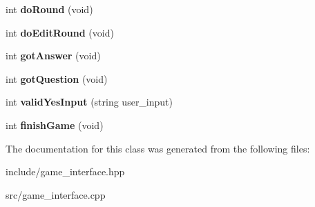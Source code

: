 \begin{DoxyCompactItemize}
\item 
int {\bfseries do\+Round} (void)\hypertarget{classGameInterface_a34f3d7f2ba56662cc0108b54b19fc162}{}\label{classGameInterface_a34f3d7f2ba56662cc0108b54b19fc162}

\item 
int {\bfseries do\+Edit\+Round} (void)\hypertarget{classGameInterface_ad254aa8d489bc420592eae3ed3bc008d}{}\label{classGameInterface_ad254aa8d489bc420592eae3ed3bc008d}

\item 
int {\bfseries got\+Answer} (void)\hypertarget{classGameInterface_a0a7e8e6ca668c755e8ccc94ff091dd5b}{}\label{classGameInterface_a0a7e8e6ca668c755e8ccc94ff091dd5b}

\item 
int {\bfseries got\+Question} (void)\hypertarget{classGameInterface_afb911f0c555e8c3ba0f4be8974a49a58}{}\label{classGameInterface_afb911f0c555e8c3ba0f4be8974a49a58}

\item 
int {\bfseries valid\+Yes\+Input} (string user\+\_\+input)\hypertarget{classGameInterface_a1a06b1226a86254b6540ec08d0745009}{}\label{classGameInterface_a1a06b1226a86254b6540ec08d0745009}

\item 
int {\bfseries finish\+Game} (void)\hypertarget{classGameInterface_a7899bb55a3697443174908d0893eeb7a}{}\label{classGameInterface_a7899bb55a3697443174908d0893eeb7a}

\end{DoxyCompactItemize}


The documentation for this class was generated from the following files\+:\begin{DoxyCompactItemize}
\item 
include/game\+\_\+interface.\+hpp\item 
src/game\+\_\+interface.\+cpp\end{DoxyCompactItemize}
